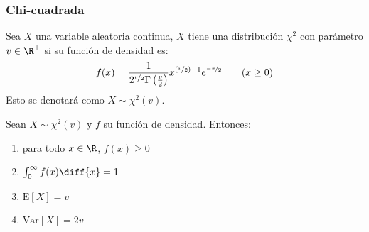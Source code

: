 \subsubsection{Chi-cuadrada}
\begin{Def}
    Sea $X$ una variable aleatoria continua, $X$ tiene una
    distribución $\chi^2$ con parámetro $v\in\R^+$ si su función de densidad
    es:
    \[
        f(x) = \frac{1}{2^{\nicefrac{v}{2}}\Gamma\left(\frac{v}{2}\right)}
        x^{\left(\nicefrac{v}{2}\right)-1}e^{\nicefrac{-x}{2}} \qquad(x\geq0)
    \]
    Esto se denotará como $X\sim\chi^2(v)$.
\end{Def}

\begin{Teo}
    Sean $X \sim \chi^2(v)$ y $f$ su función de densidad. Entonces:
    \begin{enumerate}
        \item para todo $x\in \R$, $f(x)\geq0$
        \item $\int_{0}^{\infty}f(x)\diff{x}=1$
        \item $\text{E}[X]= v$
        \item $\text{Var}[X]= 2v$
    \end{enumerate}
\end{Teo}


